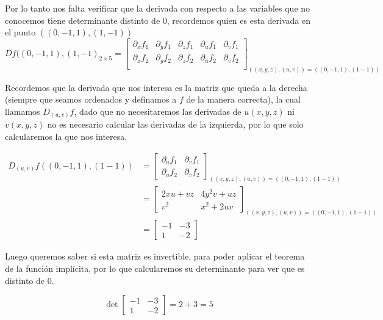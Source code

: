 \documentclass[a4paper,oneside,10.5pt]{article}
\begin{document}
Por lo tanto nos falta verificar que la derivada con respecto a las variables que no conocemos tiene determinante distinto de $0$, recordemos quien es esta derivada en el punto $((0, -1, 1), (1, -1))$
\begin{equation*}
    Df((0, -1, 1), (1, -1)_{2 \times 5} = \left[\begin{array}{ccc|cc}
        \partial_x f_1 & \partial_y f_1 & \partial_z f_1 & \partial_u f_1 & \partial_v f_1\\
        \partial_x f_2 & \partial_y f_2 & \partial_z f_2 & \partial_u f_2 & \partial_v f_2\\
    \end{array}
    \right]_{((x, y, z), (u, v)) = ((0, -1, 1), (1 -1))}
\end{equation*}

Recordemos que la derivada que nos interesa es la matriz que queda a la derecha (siempre que seamos ordenados y definamos a $f$ de la manera correcta), la cual llamamos $D_{(u, v)}f$, dado que no necesitaremos las derivadas de $u(x, y, z)$ ni $v(x, y, z)$ no es necesario calcular las derivadas de la izquierda, por lo que solo calcularemos la que nos interesa.

\begin{align*}
    D_{(u, v)}f((0, -1, 1), (1 -1)) &= \begin{bmatrix}
        \partial_u f_1 & \partial_v f_1\\
        \partial_u f_2 & \partial_v f_2
    \end{bmatrix}_{((x, y, z), (u, v)) = ((0, -1, 1), (1 -1))}\\
    &= \begin{bmatrix}
            2xu + vz & 4y^2v + uz\\
            v^2 & x^2 + 2uv
        \end{bmatrix}_{((x, y, z), (u, v)) = ((0, -1, 1), (1 -1))}\\
    &= \begin{bmatrix}
        -1 & -3\\
        1 & -2
        \end{bmatrix}
\end{align*}

Luego queremos saber si esta matriz es invertible, para poder aplicar el teorema de la función implícita, por lo que calcularemos su determinante para ver que es distinto de $0$.

\begin{equation*}
    \det \begin{bmatrix}
        -1 & -3\\
        1 & -2
        \end{bmatrix} = 2 + 3 = 5
\end{equation*}
\end{document}
